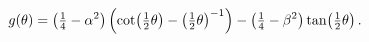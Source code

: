 \[g(\theta)=\left(\tfrac{1}{4}-\alpha^{2}\right)\left(\mathop{\cot\/}\nolimits\!%
\left(\tfrac{1}{2}\theta\right)-\left(\tfrac{1}{2}\theta\right)^{-1}\right)-%
\left(\tfrac{1}{4}-\beta^{2}\right)\mathop{\tan\/}\nolimits\!\left(\tfrac{1}{2%
}\theta\right).\]